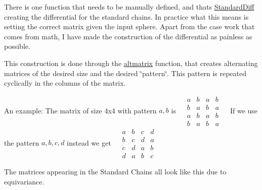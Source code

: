 \begin{DoxyItemize}
\item There is one function that needs to be manually defined, and that\textquotesingle{}s \hyperlink{classGroupSpecific_1_1Function_a8ead55e2f2e2bbda4deea3964793498d}{Standard\+Diff} creating the differential for the standard chains. In practice what this means is setting the correct matrix given the input sphere. Apart from the case work that comes from math, I have made the construction of the differential as painless as possible.
\item This construction is done through the \hyperlink{namespaceMackey_a26a529f63caac9c5b4dc809e0e5831be}{altmatrix} function, that creates alternating matrices of the desired size and the desired \char`\"{}pattern\char`\"{}. This pattern is repeated cyclically in the columns of the matrix.
\item An example\+: The matrix of size 4x4 with pattern $a,b$ is ~\newline
 $\begin{matrix} a&b&a&b\\ b&a&b&a\\ a&b&a&b \\ b&a&b&a \end{matrix}$ ~\newline
 If we use the pattern $a,b,c,d$ instead we get ~\newline
 $\begin{matrix} a&b&c&d\\ b&c&d&a\\ c&d&a&b \\ d&a&b&c \end{matrix}$ ~\newline

\item The matrices appearing in the Standard Chains all look like this due to equivariance. 
\end{DoxyItemize}